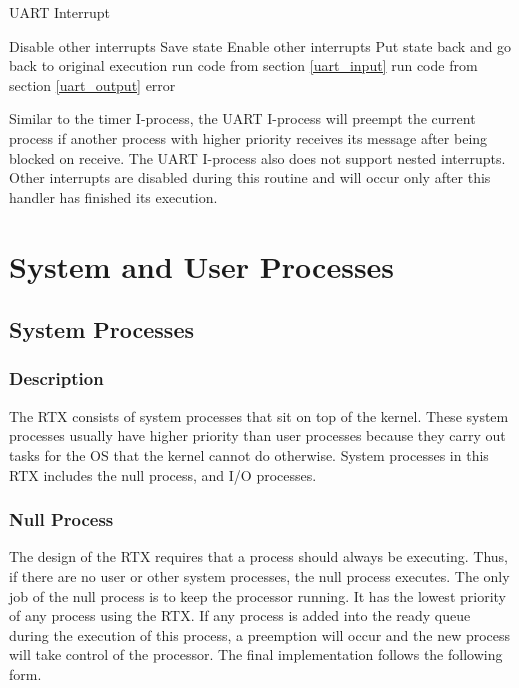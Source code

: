 \documentclass[12pt]{report}
\begin{document}
\begin{algorithm}
    \caption{UART Interrupt}
    \begin{algorithmic}[1]
          \State Disable other interrupts
          \State Save state
          \State {}
          \State Enable other interrupts
          \State Put state back and go back to original execution
      \EndFunction
      \bigskip
              \State run code from section \ref{uart_input}
              \State run code from section \ref{uart_output}
          \Else
              \State error
          \EndIf
      \EndFunction
  \end{algorithmic}
\end{algorithm}

Similar to the timer I-process, the UART I-process will preempt the current process if another process with higher priority receives its message after being blocked on receive. The UART I-process also does not support nested interrupts. Other interrupts are disabled during this routine and will occur only after this handler has finished its execution.


\chapter{System and User Processes}

\section{System Processes}
\subsection{Description}
The RTX consists of system processes that sit on top of the kernel. These system processes usually have higher priority than user processes because they carry out tasks for the OS that the kernel cannot do otherwise. System processes in this RTX includes the null process, and I/O processes.

\subsection{Null Process}
The design of the RTX requires that a process should always be executing. Thus, if there are no user or other system processes, the null process executes. The only job of the null process is to keep the processor running. It has the lowest priority of any process using the RTX. If any process is added into the ready queue during the execution of this process, a preemption will occur and the new process will take control of the processor. The final implementation follows the following form.
\end{document}
